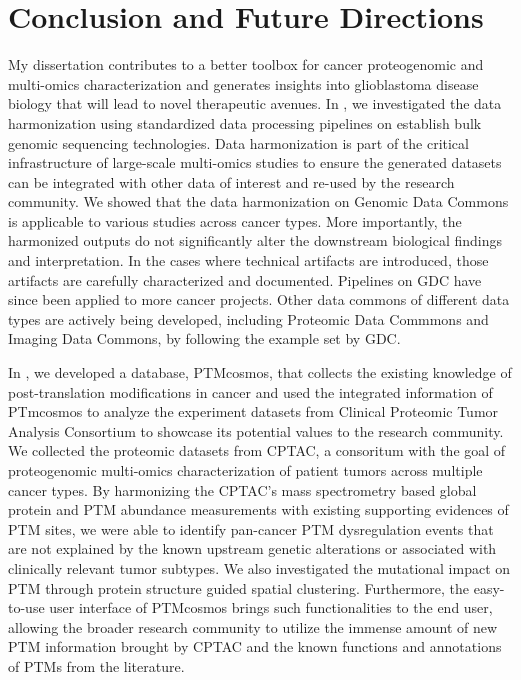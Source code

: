 \chapter{Conclusion and Future Directions}
\label{chap:conclusion}

My dissertation contributes to a better toolbox for cancer proteogenomic and multi-omics characterization and generates insights into glioblastoma disease biology that will lead to novel therapeutic avenues. In , we investigated the data harmonization using standardized data processing pipelines on establish bulk genomic sequencing technologies. Data harmonization is part of the critical infrastructure of large-scale multi-omics studies to ensure the generated datasets can be integrated with other data of interest and re-used by the research community. We showed that the data harmonization on Genomic Data Commons is applicable to various studies across cancer types. More importantly, the harmonized outputs do not significantly alter the downstream biological findings and interpretation. In the cases where technical artifacts are introduced, those artifacts are carefully characterized and documented. Pipelines on GDC have since been applied to more cancer projects. Other data commons of different data types are actively being developed, including Proteomic Data Commmons and Imaging Data Commons, by following the example set by GDC.

In , we developed a database, PTMcosmos, that collects the existing knowledge of post-translation modifications in cancer and used the integrated information of PTmcosmos to analyze the experiment datasets from Clinical Proteomic Tumor Analysis Consortium to showcase its potential values to the research community. We collected the proteomic datasets from CPTAC, a consoritum with the goal of proteogenomic multi-omics characterization of patient tumors across multiple cancer types. By harmonizing the CPTAC's mass spectrometry based global protein and PTM abundance measurements with existing supporting evidences of PTM sites, we were able to identify pan-cancer PTM dysregulation events that are not explained by the known upstream genetic alterations or associated with clinically relevant tumor subtypes. We also investigated the mutational impact on PTM through protein structure guided spatial clustering. Furthermore, the easy-to-use user interface of PTMcosmos brings such functionalities to the end user, allowing the broader research community to utilize the immense amount of new PTM information brought by CPTAC and the known functions and annotations of PTMs from the literature.

